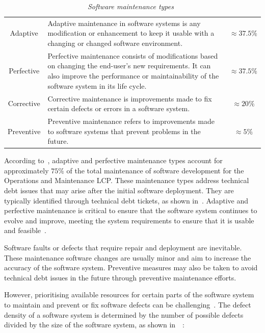 \begin{table}[!htb]
	\centering
	\caption[Software maintenance types]
	{\textit{Software maintenance types~\cite{Ping2010,Hasan2012}}}
	\label{tbl:ch1_maintenanceTypes}
	\begin{tabularx}{\textwidth}{cXc}
		\toprule
		\thead{Maintenance type} & \thead{Description} & \thead{$\%$ of maintenance activities} \\ 
		\midrule

		\rowcolor{lightgray}
		Adaptive & \raggedright Adaptive maintenance in software systems is any modification or enhancement to keep it usable with a changing or changed software environment. & $\approx 37.5\%$ \\ 

		Perfective & \raggedright Perfective maintenance consists of modifications based on changing the end-user's new requirements. It can also improve the performance or maintainability of the software system in its life cycle. & $\approx 37.5\%$ \\ 
		
		\rowcolor{lightgray}
		Corrective & \raggedright Corrective maintenance is improvements made to fix certain defects or errors in a software system. & $\approx 20\%$ \\ 

		\rowcolor{lightgray}
		Preventive & \raggedright  Preventive maintenance refers to improvements made to software systems that prevent problems in the future. & $\approx 5\%$ \\ 
		\bottomrule
	\end{tabularx}
\end{table}

According to~, adaptive and perfective maintenance types account for approximately $75\%$ of the total maintenance of software development for the Operations and Maintenance LCP. These maintenance types address technical debt issues that may arise after the initial software deployment. They are typically identified through technical debt tickets, as shown in~. Adaptive and perfective maintenance is critical to ensure that the software system continues to evolve and improve, meeting the system requirements to ensure that it is usable and feasible~\cite{Kumar2013}.\par Software faults or defects that require repair and deployment are inevitable. These maintenance software changes are usually minor and aim to increase the accuracy of the software system. Preventive measures may also be taken to avoid technical debt issues in the future through preventive maintenance efforts. \par However, prioritising available resources for certain parts of the software system to maintain and prevent or fix software defects can be challenging~\cite{Mamone1994, Hasan2012}. The defect density of a software system is determined by the number of possible defects divided by the size of the software system, as shown in~~\cite{Rahmani2010}:

